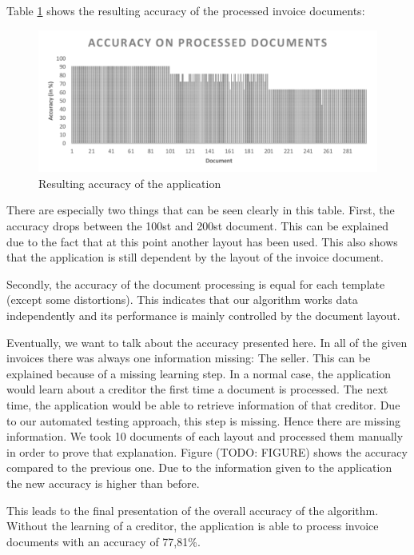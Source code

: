 Table \ref{accuracyTable} shows the resulting accuracy of the processed invoice documents: 
\begin{figure}[ht!]
\centering
\includegraphics[width=\textwidth]{Images/Accuracy/accuracyTable.pdf}
\caption{Resulting accuracy of the application \label{accuracyTable}}
\end{figure}

There are especially two things that can be seen clearly in this table. First, the accuracy drops between the 100st and 200st document. This can be explained due to the fact that at this point another layout has been used. This also shows that the application is still dependent by the layout of the invoice document.

Secondly, the accuracy of the document processing is equal for each template (except some distortions). This indicates that our algorithm works data independently and its performance is mainly controlled by the document layout.

Eventually, we want to talk about the accuracy presented here. In all of the given invoices there was always one information missing: The seller. This can be explained because of a missing learning step. In a normal case, the application would learn about a creditor the first time a document is processed. The next time, the application would be able to retrieve information of that creditor. Due to our automated testing approach, this step is missing. Hence there are missing information.
We took 10 documents of each layout and processed them manually in order to prove that explanation. Figure (TODO: FIGURE) shows the accuracy compared to the previous one. Due to the information given to the application the new accuracy is higher than before.

This leads to the final presentation of the overall accuracy of the algorithm. Without the learning of a creditor, the application is able to process invoice documents with an accuracy of 77,81\%.